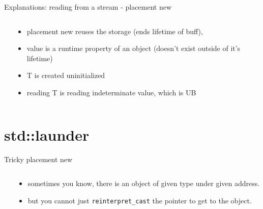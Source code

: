 \documentclass{panicsoftware-presentation}
\makeatletter
\newenvironment{itemizeSeq}{\begin{itemize}[<+-|alert@+>]}{\end{itemize}}
\makeatother
\begin{document}
\begin{frame}{Explanations: reading from a stream - placement new}

\begin{columns}

\begin{column}{0.48\linewidth}

\inputminted{\myCpp}{examples/invalid_reinterpret_cast-2.cpp}
\end{column}

\begin{column}{0.48\linewidth}

\begin{itemizeSeq}
\item placement new reuses the storage (ends lifetime of buff),
\item value is a runtime property of an object (doesn't exist outside of it's lifetime)
\item T is created uninitialized
\item reading T is reading indeterminate value, which is UB
\end{itemizeSeq}

\end{column}
\end{columns}
\end{frame}

\section*{std::launder}

\begin{frame}{Tricky placement new}

\begin{columns}

\begin{column}{0.48\linewidth}
\inputminted{\myCpp}{examples/placement-new-issue.cpp}
\end{column}

\begin{column}{0.48\linewidth}
\begin{itemizeSeq}
\item sometimes you know, there is an object of given type under given address.
\item but you cannot just \texttt{reinterpret\_cast} the pointer to get to the object.
\end{itemizeSeq}
\end{column}
\end{columns}
\end{frame}
\end{document}
